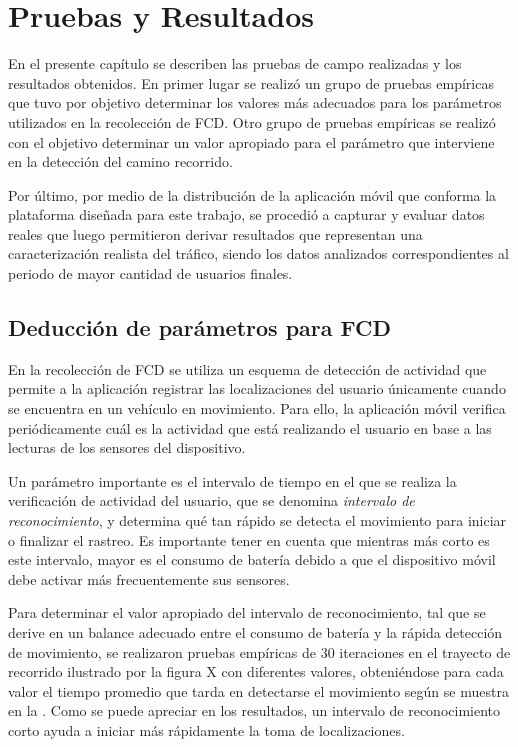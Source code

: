 \chapter{Pruebas y Resultados}
\label{cap:7}

En el presente capítulo se describen las pruebas de campo realizadas y los resultados obtenidos. En primer lugar se realizó un grupo de pruebas empíricas que tuvo por objetivo determinar los valores más adecuados para los parámetros utilizados en la recolección de FCD. Otro grupo de pruebas empíricas se realizó con el objetivo determinar un valor apropiado para el parámetro que interviene en la detección del camino recorrido.

Por último, por medio de la distribución de la aplicación móvil que conforma la plataforma diseñada para este trabajo, se procedió a capturar y evaluar datos reales que luego permitieron derivar resultados que representan una caracterización realista del tráfico, siendo los datos analizados correspondientes al periodo de mayor cantidad de usuarios finales.

\section{Deducción de parámetros para FCD}

En la recolección de FCD se utiliza un esquema de detección de actividad que permite a la aplicación registrar las localizaciones del usuario únicamente cuando se encuentra en un vehículo en movimiento. Para ello, la aplicación móvil verifica periódicamente cuál es la actividad que está realizando el usuario en base a las lecturas de los sensores del dispositivo. 

Un parámetro importante es el intervalo de tiempo en el que se realiza la verificación de actividad del usuario, que se denomina \emph{intervalo de reconocimiento}, y determina qué tan rápido se detecta el movimiento para iniciar o finalizar el rastreo. Es importante tener en cuenta que mientras más corto es este intervalo, mayor es el consumo de batería debido a que el dispositivo móvil debe activar más frecuentemente sus sensores. 


Para determinar el valor apropiado del intervalo de reconocimiento, tal que se derive en un balance adecuado entre el consumo de batería y la rápida detección de movimiento, se realizaron pruebas empíricas de 30 iteraciones en el trayecto de recorrido ilustrado por la figura X con diferentes valores, obteniéndose para cada valor el tiempo promedio que tarda en detectarse el movimiento según se muestra en la . Como se puede apreciar en los resultados, un intervalo de reconocimiento corto ayuda a iniciar más rápidamente la toma de localizaciones.

